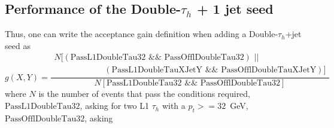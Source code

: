 \documentclass[../main.tex]{subfiles}
\begin{document}
\subsection{Performance of the Double-$\tau_h$ + 1 jet seed}






 Thus, one can write the acceptance gain definition when adding a Double-$\tau_h$+jet seed as
\begin{equation}
g(X, Y) = \frac{\begin{matrix}N[(\text{PassL1DoubleTau32} \,\,\&\&\,\, \text{PassOfflDoubleTau32}) \,\,||\,\, \\ \qquad\qquad\qquad(\text{PassL1DoubleTauXJetY} \,\,\&\&\,\, \text{PassOfflDoubleTauXJetY})] \end{matrix}}{N[\text{PassL1DoubleTau32} \,\,\&\&\,\, \text{PassOfflDoubleTau32}]}
\end{equation}
where $N$ is the number of events that pass the conditions required, $\text{PassL1DoubleTau32}$, asking for two L1 $\tau_h$ with a $p_t >= 32$~GeV, $\text{PassOfflDoubleTau32}$, asking 








%
%
\end{document}
